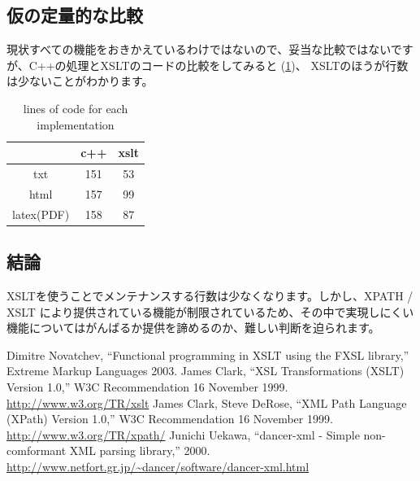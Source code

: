 \documentclass[mingoth,a4paper]{jsarticle}
\begin{document}
\subsection{仮の定量的な比較}

現状すべての機能をおきかえているわけではないので、妥当な比較ではないです
が、C++の処理とXSLTのコードの比較をしてみると
(\ref{tab:xsltcxximplementationdiff})、
XSLTのほうが行数は少ないことがわかります。

\begin{table}[ht]
 \caption{lines of code for each implementation}
 \label{tab:xsltcxximplementationdiff}
\begin{center}
  \begin{tabular}{|c|c|c|}
 \hline
 & c++ & xslt \\
 \hline
 txt & 151 & 53\\
 html & 157 & 99 \\
 latex(PDF) & 158 & 87 \\
 \hline
 \end{tabular}
\end{center}
\end{table}

\subsection{結論}

XSLTを使うことでメンテナンスする行数は少なくなります。しかし、XPATH /
XSLT により提供されている機能が制限されているため、その中で実現しにくい
機能についてはがんばるか提供を諦めるのか、難しい判断を迫られます。

\begin{thebibliography}{0}
  Dimitre Novatchev, ``Functional programming in XSLT
	 using the FXSL library,'' Extreme Markup Languages 2003.
  James Clark, ``XSL Transformations (XSLT)
	 Version 1.0,'' W3C Recommendation 16 November 1999.
	 \url{http://www.w3.org/TR/xslt}
  James Clark, Steve DeRose, ``XML Path Language
	 (XPath) Version 1.0,'' W3C Recommendation 16 November 1999.
	 \url{http://www.w3.org/TR/xpath/}
  Junichi Uekawa, ``dancer-xml - Simple
	 non-comformant XML parsing library,'' 2000.
	 \url{http://www.netfort.gr.jp/~dancer/software/dancer-xml.html}
\end{thebibliography}


\end{document}
